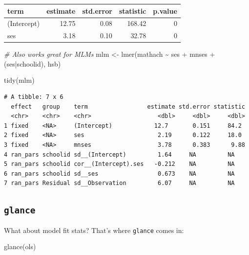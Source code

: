 \documentclass[
  letterpaper,
  DIV=11,
  numbers=noendperiod]{scrreprt}
\newenvironment{Shaded}{}{}
\newcommand{\CommentTok}[1]{\textcolor[rgb]{0.38,0.63,0.69}{\textit{#1}}}
\newcommand{\FunctionTok}[1]{\textcolor[rgb]{0.02,0.16,0.49}{#1}}
\newcommand{\NormalTok}[1]{#1}
\newcommand{\OtherTok}[1]{\textcolor[rgb]{0.00,0.44,0.13}{#1}}
\newcommand{\SpecialCharTok}[1]{\textcolor[rgb]{0.25,0.44,0.63}{#1}}
\begin{document}
\begin{longtable}[]{@{}lrrrr@{}}
\toprule\noalign{}
term & estimate & std.error & statistic & p.value \\
\midrule\noalign{}
\endhead
\bottomrule\noalign{}
\endlastfoot
(Intercept) & 12.75 & 0.08 & 168.42 & 0 \\
ses & 3.18 & 0.10 & 32.78 & 0 \\
\end{longtable}

\begin{Shaded}
\begin{Highlighting}[]
\CommentTok{\# Also works great for MLMs}
\NormalTok{mlm }\OtherTok{\textless{}{-}} \FunctionTok{lmer}\NormalTok{(mathach }\SpecialCharTok{\textasciitilde{}}\NormalTok{ ses }\SpecialCharTok{+}\NormalTok{ mnses }\SpecialCharTok{+}\NormalTok{ (ses}\SpecialCharTok{|}\NormalTok{schoolid), hsb)}

\FunctionTok{tidy}\NormalTok{(mlm)}
\end{Highlighting}
\end{Shaded}

\begin{verbatim}
# A tibble: 7 x 6
  effect   group    term                 estimate std.error statistic
  <chr>    <chr>    <chr>                   <dbl>     <dbl>     <dbl>
1 fixed    <NA>     (Intercept)            12.7       0.151     84.2 
2 fixed    <NA>     ses                     2.19      0.122     18.0 
3 fixed    <NA>     mnses                   3.78      0.383      9.88
4 ran_pars schoolid sd__(Intercept)         1.64     NA         NA   
5 ran_pars schoolid cor__(Intercept).ses   -0.212    NA         NA   
6 ran_pars schoolid sd__ses                 0.673    NA         NA   
7 ran_pars Residual sd__Observation         6.07     NA         NA   
\end{verbatim}

\subsection{\texorpdfstring{\texttt{glance}}{glance}}\label{glance}

What about model fit stats? That's where \texttt{glance} comes in:

\begin{Shaded}
\begin{Highlighting}[]
\FunctionTok{glance}\NormalTok{(ols)}
\end{Highlighting}
\end{Shaded}
\end{document}
